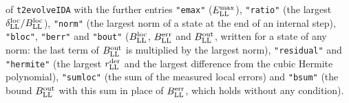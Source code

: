 \documentclass[
  10pt,
]{article}
\begin{document}
of \texttt{t2evolveIDA} with the further entries \texttt{"emax"}
(\(E^{\rm max}_{\rm LL}\)), \texttt{"ratio"} (the largest
\(\delta^{\rm loc}_{\rm LL}/B^{\rm loc}_{\rm LL}\)), \texttt{"norm"}
(the largest norm of a state at the end of an internal step),
\texttt{"bloc"}, \texttt{"berr"} and \texttt{"bout"}
(\(B^{\rm loc}_{\rm LL}\), \(B^{\rm err}_{\rm LL}\) and
\(B^{\rm out}_{\rm LL}\), written for a state of any norm: the last term
of \(B^{\rm out}_{\rm LL}\) is multiplied by the largest norm),
\texttt{"residual"} and \texttt{"hermite"} (the largest
\(r^{\rm der}_{\rm LL}\) and the largest difference from the cubic
Hermite polynomial), \texttt{"sumloc"} (the sum of the measured local
errors) and \texttt{"bsum"} (the bound \(B^{\rm out}_{\rm LL}\) with
this sum in place of \(B^{\rm err}_{\rm LL}\), which holds without any
condition).
\end{document}
